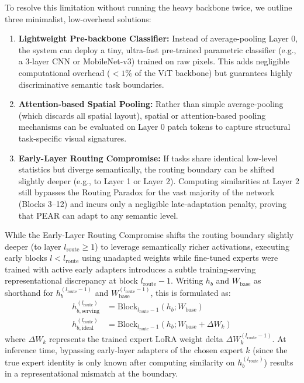 To resolve this limitation without running the heavy backbone twice, we outline three minimalist, low-overhead solutions:
\begin{enumerate}
    \item \textbf{Lightweight Pre-backbone Classifier:} Instead of average-pooling Layer 0, the system can deploy a tiny, ultra-fast pre-trained parametric classifier (e.g., a 3-layer CNN or MobileNet-v3) trained on raw pixels. This adds negligible computational overhead ($<1\%$ of the ViT backbone) but guarantees highly discriminative semantic task boundaries.
    \item \textbf{Attention-based Spatial Pooling:} Rather than simple average-pooling (which discards all spatial layout), spatial or attention-based pooling mechanisms can be evaluated on Layer 0 patch tokens to capture structural task-specific visual signatures.
    \item \textbf{Early-Layer Routing Compromise:} If tasks share identical low-level statistics but diverge semantically, the routing boundary can be shifted slightly deeper (e.g., to Layer 1 or Layer 2). Computing similarities at Layer 2 still bypasses the Routing Paradox for the vast majority of the network (Blocks 3--12) and incurs only a negligible late-adaptation penalty, proving that PEAR can adapt to any semantic level.
\end{enumerate}
While the Early-Layer Routing Compromise shifts the routing boundary slightly deeper (to layer $l_{\text{route}} \geq 1$) to leverage semantically richer activations, executing early blocks $l < l_{\text{route}}$ using unadapted weights while fine-tuned experts were trained with active early adapters introduces a subtle training-serving representational discrepancy at block $l_{\text{route}}-1$. Writing $h_b$ and $W_{\text{base}}$ as shorthand for $h_b^{(l_{\text{route}}-1)}$ and $W_{\text{base}}^{(l_{\text{route}}-1)}$, this is formulated as:
\begin{align}
    h_{b,\text{serving}}^{(l_{\text{route}})} &= \text{Block}_{l_{\text{route}}-1}\left(h_b; W_{\text{base}}\right) \nonumber \\
    h_{b,\text{ideal}}^{(l_{\text{route}})} &= \text{Block}_{l_{\text{route}}-1}\left(h_b; W_{\text{base}} + \Delta W_k\right)
\end{align}
where $\Delta W_k$ represents the trained expert LoRA weight delta $\Delta W_k^{(l_{\text{route}}-1)}$. At inference time, bypassing early-layer adapters of the chosen expert $k$ (since the true expert identity is only known after computing similarity on $h_b^{(l_{\text{route}})}$) results in a representational mismatch at the boundary.

